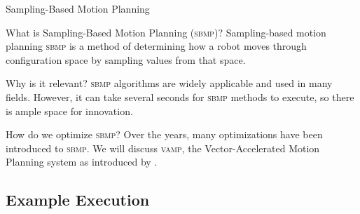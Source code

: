 \documentclass{beamer}
\begin{document}
\begin{frame}{Sampling-Based Motion Planning}

\pause
\begin{block}{What is Sampling-Based Motion Planning (\textsc{sbmp})?}
Sampling-based motion planning \textsc{sbmp} is a method of determining how a robot moves through configuration space by sampling values from that space. %
\end{block}

\pause
\begin{block}{Why is it relevant?} 
\textsc{sbmp} algorithms are widely applicable and used in many fields. %
However, it can take several seconds for \textsc{sbmp} methods to execute, so there is ample space for innovation.
\end{block}

\pause
{}

\pause
\begin{block}{How do we optimize \textsc{sbmp}?}
Over the years, many optimizations have been introduced to \textsc{sbmp}. We will discuss \textsc{vamp}, the Vector-Accelerated Motion Planning system as introduced by \cite{paper:MiM}.
\end{block}
\end{frame}

\subsection{Example Execution}
\end{document}
